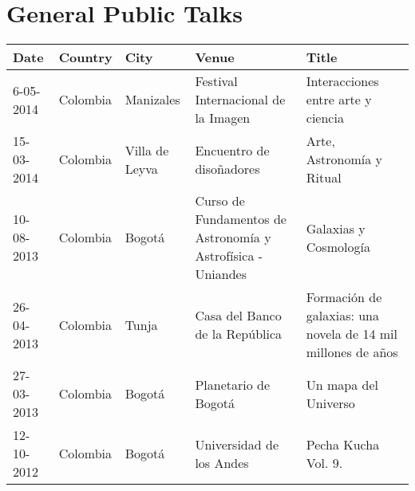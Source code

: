 \documentclass{report}
\begin{document}
\section*{General Public Talks}


\begin{tabular}{p{2.0cm} p{1.5cm} p{1.5cm} p{2cm} p{5cm}}\hline
Date & Country & City& Venue& Title\\\hline
6-05-2014 & Colombia & Manizales & Festival Internacional de la Imagen & Interacciones entre arte y ciencia\\
15-03-2014  & Colombia & Villa de Leyva & Encuentro de disoñadores & Arte, Astronomía y Ritual \\
10-08-2013 & Colombia & Bogot\'a & Curso de Fundamentos de Astronom\'ia y Astrof\'isica - Uniandes &
Galaxias y Cosmolog\'ia\\
26-04-2013 & Colombia & Tunja & Casa del Banco de la Rep\'ublica &
Formaci\'on de galaxias: una novela de 14 mil millones de a\~nos\\  
27-03-2013 & Colombia & Bogot\'a & Planetario de Bogot\'a & Un mapa del
Universo\\
12-10-2012 & Colombia & Bogot\'a & Universidad de los Andes & Pecha
Kucha Vol. 9.
\end{tabular}
\end{document}

